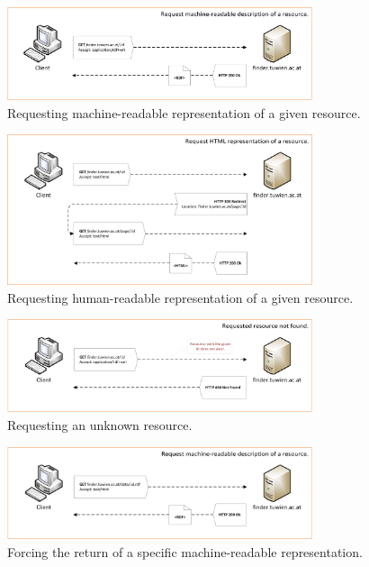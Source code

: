 \documentclass[draft,final]{vutinfth} %
\begin{document}
\begin{figure}[h]
    \centering
    \includegraphics[width=0.8\textwidth]{graphics/solution/uri-strategy/uriStrategyMachineReadable.png}
    \caption{Requesting machine-readable representation of a given resource.}
    \label{fig:solution-architectural-prototype:ld-publishing:machine-readable}
\end{figure}

\begin{figure}[h]
    \centering
    \includegraphics[width=0.8\textwidth]{graphics/solution/uri-strategy/uriStrategyHumanReadable.png}
    \caption{Requesting human-readable representation of a given resource.}
    \label{fig:solution-architectural-prototype:ld-publishing:human-readable}
\end{figure}

\begin{figure}[h]
    \centering
    \includegraphics[width=0.8\textwidth]{graphics/solution/uri-strategy/uriStrategyErrorHandling.png}
    \caption{Requesting an unknown resource.}
    \label{fig:solution-architectural-prototype:ld-publishing:404}
\end{figure}

\begin{figure}[h]
    \centering
    \includegraphics[width=0.8\textwidth]{graphics/solution/uri-strategy/uriStrategyForceMachineReadable.png}
    \caption{Forcing the return of a specific machine-readable representation.}
    \label{fig:solution-architectural-prototype:ld-publishing:force-machine-readable}
\end{figure}
\end{document}
